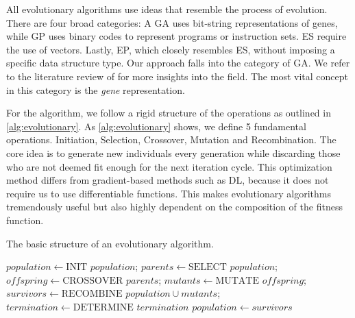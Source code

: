 \documentclass[./../../paper.tex]{subfiles}
\begin{document}





All evolutionary algorithms use ideas that resemble the process of evolution. There are four broad categories: A \gls{GA} uses bit-string representations of genes, while \gls{GP} uses binary codes to represent programs or instruction sets. \gls{ES} require the use of vectors. Lastly, \gls{EP}, which closely resembles \gls{ES}, without imposing a specific data structure type\cite{lambora_GeneticAlgorithmLiterature_2019,vikhar_Evolutionaryalgorithmscritical_2016}. Our approach falls into the category of \gls{GA}. We refer to the literature review of \citeauthor{vikhar_Evolutionaryalgorithmscritical_2016} for more insights into the field. The most vital concept in this category is the \emph{gene} representation. 

For the algorithm, we follow a rigid structure of the operations as outlined in \autoref{alg:evolutionary}. 
As \autoref{alg:evolutionary} shows, we define 5 fundamental operations. Initiation, Selection, Crossover, Mutation and Recombination. 
The core idea is to generate new individuals every generation while discarding those who are not deemed fit enough for the next iteration cycle. This optimization method differs from gradient-based methods such as \gls{DL}, because it does not require us to use differentiable functions. This makes evolutionary algorithms tremendously useful but also highly dependent on the composition of the fitness function.

\begin{algorithm}[htb!]
    \caption{The basic structure of an evolutionary algorithm.}
    \begin{algorithmic}
        \State $population \gets \text{INIT } population$;
        \State $parents \gets \text{SELECT } population$;
        \State $offspring \gets \text{CROSSOVER } parents$;
        \State $mutants \gets \text{MUTATE } offspring$;
        \State $survivors \gets \text{RECOMBINE } population \cup mutants$;
        \State $termination \gets \text{DETERMINE } termination$
        \State $population \gets survivors$
        \EndWhile
    \end{algorithmic}
    \label{alg:evolutionary}
\end{algorithm}
\end{document}
